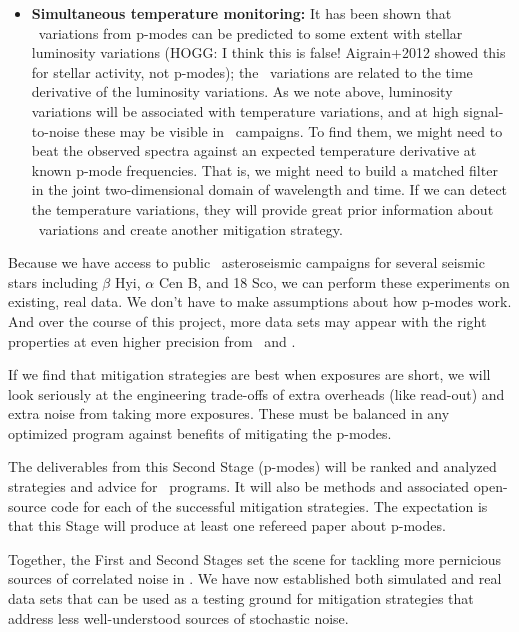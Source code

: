 \documentclass[12pt, letterpaper]{article}
\begin{document}
\begin{itemize}
\item
\textbf{Simultaneous temperature monitoring:}
It has been shown that \RV\ variations from p-modes can be predicted
to some extent with stellar luminosity variations (HOGG: I think this is false! 
Aigrain+2012 showed this for stellar activity, not p-modes);
the \RV\ variations are related to the time derivative of the
luminosity variations.
As we note above, luminosity variations will be associated with
temperature variations, and at high signal-to-noise these may be
visible in \EPRV\ campaigns.
To find them, we might need to beat the observed spectra against an
expected temperature derivative at known p-mode frequencies.
That is, we might need to build a matched filter in the joint
two-dimensional domain of wavelength and time.
If we can detect the temperature variations, they will provide great
prior information about \RV\ variations and create another mitigation
strategy.
\end{itemize}

\noindent
Because we have access to public \HARPS\ asteroseismic campaigns for 
several seismic stars including $\beta$ Hyi, $\alpha$ Cen B, and 18 Sco,
we can perform these experiments on existing, real data.
We don't have to make assumptions about how p-modes work.
And over the course of this project, more data sets may appear
with the right properties at even higher precision from \ESPRESSO\ and \NEID.

If we find that mitigation strategies are best when exposures
are short, we will look seriously at the engineering trade-offs
of extra overheads (like read-out) and extra noise from taking
more exposures. These must be balanced in any optimized program
against benefits of mitigating the p-modes.

The deliverables from this Second Stage (p-modes) will be ranked
and analyzed strategies and advice for \EPRV\ programs. It will
also be methods and associated open-source code for each of the successful
mitigation strategies.
The expectation is that this Stage will produce at least one
refereed paper about p-modes. 

Together, the First and Second Stages set the scene for tackling more
pernicious sources of correlated noise in \EPRV. We have now established 
both simulated and real data sets that can be used as a testing ground for 
mitigation strategies that address less well-understood sources of 
stochastic noise.

\end{document}
